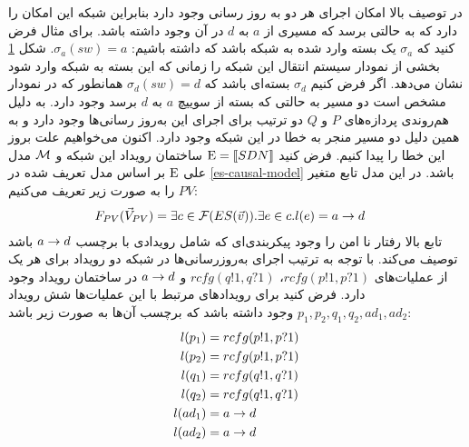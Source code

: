 \begin{figure}
    \centering
    \caption{}
    \label{fig:blacklist:lts}
\end{figure}
در توصیف بالا امکان اجرای هر دو به روز رسانی وجود دارد
بنابراین شبکه این امکان را دارد که به حالتی برسد که مسیری از 
$a$
به
$d$
در آن وجود داشته باشد.
برای مثال فرض کنید که
$\sigma_a$
یک بسته وارد شده به شبکه باشد که داشته باشیم:
$\sigma_a(sw) = a$.
شکل
\ref{fig:blacklist:lts}
بخشی از نمودار سیستم انتقال این شبکه را زمانی که این بسته به شبکه وارد شود نشان می‌دهد.
اگر فرض کنیم
$\sigma_d$
بسته‌ای باشد که
$\sigma_d(sw) = d$
همانطور که در نمودار مشخص است دو مسیر به حالتی که بسته از سوییچ
$a$
به
$d$
برسد وجود دارد.
به دلیل هم‌روندی پردازه‌های
$P$
و
$Q$
دو ترتیب برای اجرای این به‌روز رسانی‌ها وجود دارد و به همین دلیل دو مسیر منجر به خطا در این شبکه وجود دارد.
اکنون می‌خواهیم علت بروز این خطا را پیدا کنیم.
فرض کنید
$\mathrm{E} = \llbracket SDN \rrbracket$
ساختمان رویداد این شبکه و
$\mathcal{M}$
مدل علی
$\mathrm{E}$
بر اساس مدل تعریف شده در
\ref{es-causal-model}
باشد.
در این مدل تابع متغیر
$PV$
را به صورت زیر تعریف می‌کنیم:
\begin{align*}
    F_{PV}(\vec V_{PV}) & = \exists c \in \mathcal{F}(ES(\vec v)). \exists e \in c. l(e) = a\rightarrow d
\end{align*}
تابع بالا رفتار نا امن را وجود پیکربندی‌ای که شامل رویدادی با برچسب 
$a \rightarrow d$
باشد توصیف می‌کند.
با توجه به ترتیب اجرای به‌روز‌رسانی‌ها در شبکه دو رویداد برای هر یک از عملیات‌های
$rcfg(p!1,p?1)$،
$rcfg(q!1,q?1)$
و
$a \rightarrow d$
در ساختمان رویداد وجود دارد.
فرض کنید برای رویداد‌های مرتبط با این عملیات‌ها شش رویداد
$p_1,p_2,q_1,q_2,ad_1,ad_2$
وجود داشته باشد که برچسب آن‌ها به صورت زیر باشد:
\begin{align*}
    l(p_1) & = rcfg(p!1,p?1) \\
    l(p_2) & = rcfg(p!1,p?1) \\
    l(q_1) & = rcfg(q!1,q?1) \\
    l(q_2) & = rcfg(q!1,q?1) \\
    l(ad_1) & = a \rightarrow d \\
    l(ad_2) & = a \rightarrow d 
\end{align*}


